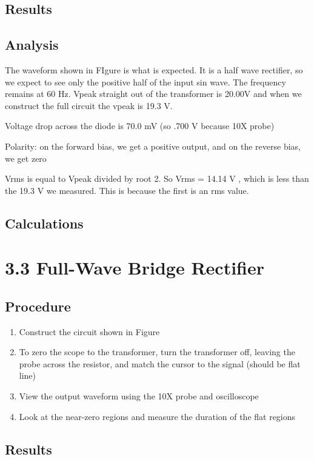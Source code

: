 \documentclass[12pt,letterpaper]{report}
\begin{document}
\subsection*{Results}
\subsection*{Analysis}
The waveform shown in FIgure 
 is what is expected. It is a half wave rectifier, so we expect to see only the positive half of the input sin wave. The frequency remains at 60 Hz. Vpeak straight out of the transformer is 20.00V and when we construct the full circuit the vpeak is 19.3 V.
 
 Voltage drop across the diode is 70.0 mV (so .700 V because 10X probe)
 
 Polarity: on the forward bias, we get a positive output, and on the reverse bias, we get zero
 
 Vrms is equal to Vpeak divided by root 2. So Vrms = 14.14 V , which is less than the 19.3 V we measured. This is because the first is an rms value.
\subsection*{Calculations}

\section*{3.3 Full-Wave Bridge Rectifier}
\subsection*{Procedure}

\begin{enumerate}
\item Construct the circuit shown in Figure %
\item To zero the scope to the transformer, turn the transformer off, leaving the probe across the resistor, and match the cursor to the signal (should be flat line)
\item View the output waveform using the 10X probe and oscilloscope
\item Look at the near-zero regions and measure the duration of the flat regions
\end{enumerate}

\subsection*{Results}
\end{document}
